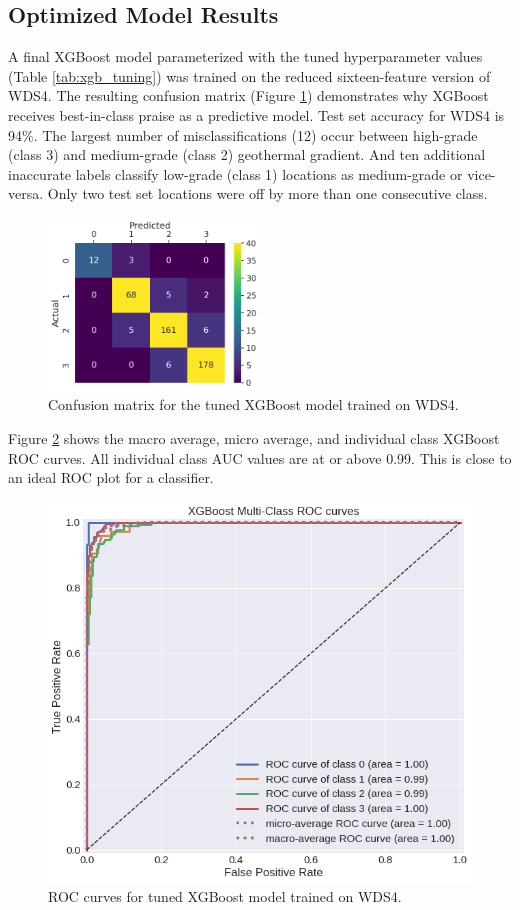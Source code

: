 \subsection{Optimized Model Results}\label{ch5:xgb_final_results}
A final XGBoost model parameterized with the tuned hyperparameter values (Table \ref{tab:xgb_tuning}) was trained on the reduced sixteen-feature version of WDS4. The resulting confusion matrix (Figure \ref{fig:xgb_conf_matrix}) demonstrates why XGBoost receives best-in-class praise as a predictive model. Test set accuracy for WDS4 is 94\%. The largest number of misclassifications (12) occur between high-grade (class 3) and medium-grade (class 2) geothermal gradient. And ten additional inaccurate labels classify low-grade (class 1) locations as medium-grade or vice-versa. Only two test set locations were off by more than one consecutive class.

\begin{figure}[!htp]
\centering
\includegraphics[width=0.5\textwidth]{templates/images/Figure-XGB16-ConfusionMatrix.png}
\singlespacing
\caption[XGBoost confusion matrix]{Confusion matrix for the tuned XGBoost model trained on WDS4.}
\label{fig:xgb_conf_matrix}
\end{figure}
\pagebreak
Figure \ref{fig:xgb_auc} shows the macro average, micro average, and individual class XGBoost ROC curves. All individual class AUC values are at or above 0.99. This is close to an ideal ROC plot for a classifier.

\begin{figure}[htp]
\centering
\includegraphics[width=.6\textwidth]{templates/images/Figure-XGB16-AUC.png}
\caption[XGBoost ROC curves]{ROC curves for tuned XGBoost model trained on WDS4.}
\label{fig:xgb_auc}
\end{figure}

